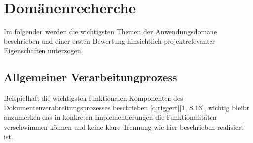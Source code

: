 \documentclass[11pt,oneside,a4paper,notitlepage]{article}
\begin{document}
%

\section{Domänenrecherche}
\label{cha:domaene}

\begin{comment}
Die Domänenrecherche zeigt auf in welcher Domäne das System zukünftig eingesetzt werden soll. Dabei soll recherchiert werden welche wichtigen Konzepte der Anwendungsdomäne eine Rolle bei der Gestaltung des Systems spielen. Es werden zudem sämtliche Informationen, Vorgänge, Metaphern und Paradigmen aus der Domäne recherchiert, in dem sich das zu entwickelnde System befindet. Die Domänenrecherche bildet die Basis für die Entwicklung eines Nutzungsproblems und der nachfolgenden Konzeption des gesamten Systems. 
\end{comment}

Im folgenden werden die wichtigsten Themen der Anwendungsdomäne beschrieben und einer ersten Bewertung
hinsichtlich projektrelevanter Eigenschaften unterzogen.



\subsection{Allgemeiner Verarbeitungprozess}
\label{sec:domaene-prozess}

Beispielhaft die wichtigsten funktionalen Komponenten des Dokumentenverabreitungsprozesses beschrieben \ref{q:riggert}{[1, S.13]}, wichtig bleibt anzumerken das in konkreten Implementierungen die Funktionalitäten verschwimmen können und keine klare Trennung wie hier beschrieben realisiert ist. 
%
%
\end{document}
